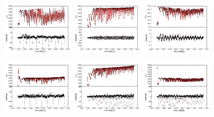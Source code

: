 \documentclass[12pt, preprint]{aastex}
\begin{document}
\begin{figure}[p]
\begin{center}
\includegraphics[width=0.32\textwidth]{f3a}
\hfill
\includegraphics[width=0.32\textwidth]{f3b}
\hfill
\includegraphics[width=0.32\textwidth]{f3c}

\includegraphics[width=0.32\textwidth]{f3d}
\hfill
\includegraphics[width=0.32\textwidth]{f3e}
\hfill
\includegraphics[width=0.32\textwidth]{f3f}


\end{center}
\end{figure}
\end{document}
